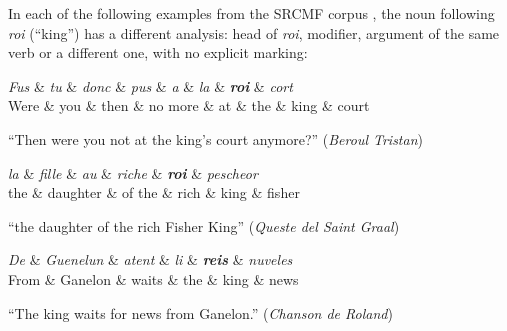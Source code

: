 In each of the following examples from the SRCMF corpus \citep{prevost-stein-2013-syntactic}, the noun following \emph{roi} (\enquote{king}) has a different analysis: head of \emph{roi}, modifier, argument of the same verb or a different one, with no explicit marking:

\begin{center}
    \begin{dependency}[theme=simple]
        \begin{deptext}[row 2/.style={font=\small}]
            \textit{Fus} \& \textit{tu} \& \textit{donc} \& \textit{pus} \& \textit{a} \& \textit{la} \& \textbf{\textit{roi}} \& \textit{cort} \\
            Were \& you \& then \& no more \& at \& the \& king \& court \\
        \end{deptext}
    \end{dependency}

    \raggedright
    \enquote{Then were you not at the king's court anymore?} (\emph{Beroul Tristan})
\end{center}

\begin{center}
    \begin{dependency}[theme=simple]
        \begin{deptext}[row 2/.style={font=\small}]
            \textit{la} \& \textit{fille} \& \textit{au} \& \textit{riche} \& \textbf{\textit{roi}} \& \textit{pescheor} \\
            the \& daughter \& of the \& rich \& king \& fisher \\
        \end{deptext}
    \end{dependency}

    \raggedright
    \enquote{the daughter of the rich Fisher King} (\emph{Queste del Saint Graal})
\end{center}

\begin{center}
    \begin{dependency}[theme=simple]
        \begin{deptext}[row 2/.style={font=\small}]
            \textit{De} \& \textit{Guenelun} \& \textit{atent} \& \textit{li} \& \textbf{\textit{reis}} \& \textit{nuveles} \\
            From \& Ganelon \& waits \& the \& king \& news \\
        \end{deptext}
    \end{dependency}

    \raggedright
    \enquote{The king waits for news from Ganelon.} (\emph{Chanson de Roland})
\end{center}

